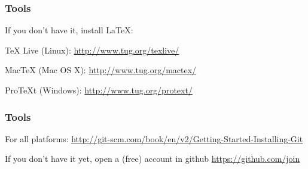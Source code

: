 \documentclass[12pt]{beamer}\usepackage[]{graphicx}\usepackage[]{color}
\begin{document}
\begin{frame}
\frametitle{Tools}

If you don't have it, install LaTeX:
\bi
 \item TeX Live (Linux):
 {\scriptsize \url{http://www.tug.org/texlive/}}
 \item MacTeX (Mac OS X): 
 {\scriptsize \url{http://www.tug.org/mactex/}}
 \item ProTeXt (Windows): 
 {\scriptsize \url{http://www.tug.org/protext/}}
\ei
\eb

\end{frame}


\begin{frame}
\frametitle{Tools}

For all platforms:
 {\scriptsize \url{http://git-scm.com/book/en/v2/Getting-Started-Installing-Git}}
\eb

If you don't have it yet, open a (free) account in github
 {\scriptsize \url{https://github.com/join}}
\eb

\end{frame}


\end{document}
